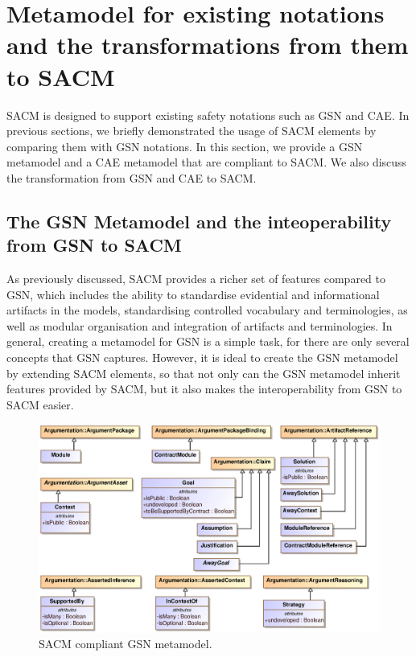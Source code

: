 \section{Metamodel for  existing notations and the transformations from them to SACM}
\label{sec:mapping}
SACM is designed to support existing safety notations such as GSN and CAE. 
In previous sections, we briefly demonstrated the usage of SACM elements by comparing them with GSN notations. 
In this section, we provide a GSN metamodel and a CAE metamodel that are compliant to SACM. 
We also discuss the transformation from GSN and CAE to SACM.

\subsection{The GSN Metamodel and the inteoperability from GSN to SACM}
As previously discussed, SACM provides a richer set of features compared to GSN, which includes the ability to standardise evidential and informational artifacts in the models, standardising controlled vocabulary and terminologies, as well as modular organisation and integration of artifacts and terminologies. 
In general, creating a metamodel for GSN is a simple task, for there are only several concepts that GSN captures. 
However, it is ideal to create the GSN metamodel by extending SACM elements, so that not only can the GSN metamodel inherit features provided by SACM, but it also makes the interoperability from GSN to SACM easier. 

\begin{figure}
	\centering
	\includegraphics[width=1\linewidth]{GSN.eps}
	\caption{SACM compliant GSN metamodel.}
	\label{fig:gsnMetamodel}
\end{figure}

